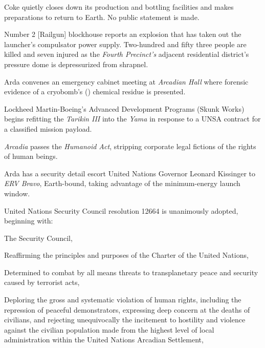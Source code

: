 \StopTimelineDate

Coke quietly closes down its production and bottling facilities and makes preparations to return to Earth. No public statement is made.
\StopTimelineDate

Number 2 [Railgun] blockhouse reports an explosion that has taken out the launcher's compulsator power supply. Two-hundred and fifty three people are killed and seven injured as the {\it Fourth Precinct's} adjacent residential district's pressure dome is depressurized from shrapnel.

Arda convenes an emergency cabinet meeting at {\it Arcadian Hall} where forensic evidence of a cryobomb's () chemical residue is presented.
\StopTimelineDate

Lockheed Martin-Boeing's Advanced Development Programs (Skunk Works) begins refitting the {\it Tarikin III} into the {\it Yama} in response to a UNSA contract for a classified mission payload.
\StopTimelineDate

{\it Arcadia} passes the {\it Humanoid Act}, stripping corporate legal fictions of the rights of human beings.
\StopTimelineDate

Arda has a security detail escort United Nations Governor Leonard Kissinger to {\it ERV Bravo}, Earth-bound, taking advantage of the minimum-energy launch window.
\StopTimelineDate

United Nations Security Council resolution 12664 is unanimously adopted, beginning with:

\startTimelineDocument
The Security Council,

Reaffirming the principles and purposes of the Charter of the United Nations,

Determined to combat by all means threats to transplanetary peace and security caused by terrorist acts,

Deploring the gross and systematic violation of human rights, including the repression of peaceful demonstrators, expressing deep concern at the deaths of civilians, and rejecting unequivocally the incitement to hostility and violence against the civilian population made from the highest level of local administration within the United Nations Arcadian Settlement,

